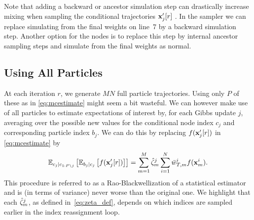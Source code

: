 Note that adding a backward or ancestor simulation step can drastically increase mixing when sampling the conditional trajectories $\mathbf{x}_j'[r]$ \citep{lindsten2013backward}. In the \ipmcmc sampler we can replace simulating from the final weights on line~7 by a backward simulation step. Another option for the \csmc nodes is to replace this step by internal ancestor sampling \citep{lindstenJS2014} steps and simulate from the final weights as normal.



\subsection{Using All Particles}
\label{sec:allparticles}
At each \mcmc iteration $r$, we generate $MN$ full particle trajectories. Using only $P$ of these as in \eqref{eq:mcestimate} might seem a bit wasteful. We can however make use of all particles to estimate expectations of interest by, for each Gibbs update $j$, averaging over the possible new values for the conditional node index $c_j$ and corresponding particle index $b_j$. We can do this by replacing $f(\mathbf{x}_j'[r])$ in \eqref{eq:mcestimate} by
\begin{align*}
\mathbb{E}_{c_j|c_{1:P\backslash j}}\left[\mathbb{E}_{b_j | c_j}\left[f(\mathbf{x}_j'[r])\right]\right] 
= \sum_{m=1}^M 
\hat{\zeta}_{m}^j
\sum_{i=1}^N
\bar w_{T,m}^i f(\mathbf{x}_{m}^i).
\end{align*}
This procedure is referred to as a Rao-Blackwellization of a statistical estimator and is (in terms of variance) never worse than the original one.  We highlight that each $\hat{\zeta}_{m}^j$, as defined in~\eqref{eq:zeta_def}, depends on which indices are sampled earlier in the index reassignment loop.  

